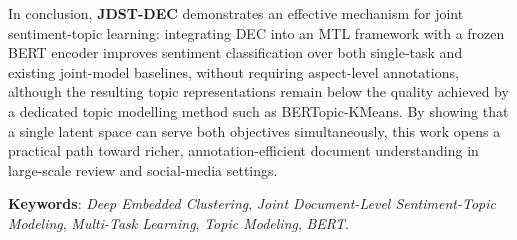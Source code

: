 {%
In conclusion, \textbf{JDST-DEC} demonstrates an effective mechanism for
joint sentiment-topic learning: integrating DEC into an MTL framework
with a frozen BERT encoder improves sentiment classification over both
single-task and existing joint-model baselines, without requiring
aspect-level annotations, although the resulting topic representations
remain below the quality achieved by a dedicated topic modelling method
such as BERTopic-KMeans. By showing that a single latent space can serve
both objectives simultaneously, this work opens a practical path toward
richer, annotation-efficient document understanding in large-scale review
and social-media settings.

\bigskip
\noindent\textbf{Keywords}: \textit{Deep Embedded Clustering},
\textit{Joint Document-Level Sentiment-Topic Modeling},
\textit{Multi-Task Learning}, \textit{Topic Modeling},
\textit{BERT}.

}

\renewcommand{\thetable}{\thechapter.\arabic{table}}
\renewcommand{\thefigure}{\thechapter.\arabic{figure}}

\newpage